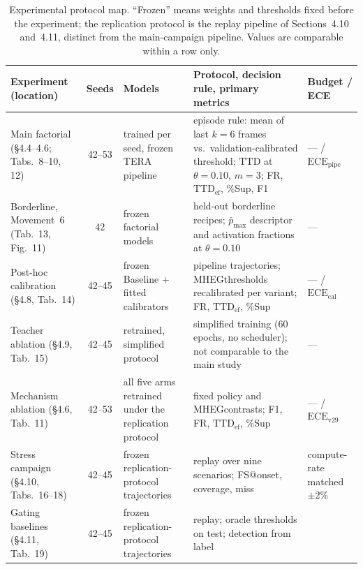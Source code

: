 \documentclass[1p,12pt,authoryear]{elsarticle}
\providecommand{\revcolor}{blue}
\providecommand{\MHEG}{MHEG}
\begin{document}
\begin{table}[!tbp]
\color{\revcolor}
\centering
\caption{Experimental protocol map. ``Frozen'' means weights and thresholds
fixed before the experiment; the replication protocol is the replay pipeline
of Sections~4.10 and~4.11,
distinct from the main-campaign pipeline. Values are comparable within a row
only.}

\scriptsize
\setlength{\tabcolsep}{2.8pt}
\renewcommand{\arraystretch}{1.18}
\begin{tabularx}{\textwidth}{>{\raggedright\arraybackslash}p{2.7cm}
  c >{\raggedright\arraybackslash}p{3.0cm} >{\raggedright\arraybackslash}X
  >{\raggedright\arraybackslash}p{2.4cm}}
\toprule
\textbf{Experiment (location)} & \textbf{Seeds} & \textbf{Models}
  & \textbf{Protocol, decision rule, primary metrics}
  & \textbf{Budget / ECE} \\
\midrule
Main factorial (\S4.4--4.6;
Tabs.~8--10,
12) & 42--53 & trained per seed, frozen TERA pipeline
  & episode rule: mean of last $k{=}6$ frames vs.\ validation-calibrated
    threshold; $\mathrm{TTD}$ at $\theta{=}0.10$, $m{=}3$; FR,
    $\mathrm{TTD}_{\mathrm{ef}}$, \%Sup, F1
  & --- / $\mathrm{ECE}_{\mathrm{pipe}}$ \\
Borderline, Movement~6 (Tab.~13,
Fig.~11) & 42 & frozen factorial models
  & held-out borderline recipes; $\bar{p}_{\max}$ descriptor and activation
    fractions at $\theta{=}0.10$ & --- \\
Post-hoc calibration (\S4.8,
Tab.~14) & 42--45 & frozen Baseline + fitted
  calibrators & pipeline trajectories; \MHEG thresholds recalibrated per
  variant; FR, $\mathrm{TTD}_{\mathrm{ef}}$, \%Sup
  & --- / $\mathrm{ECE}_{\mathrm{cal}}$ \\
Teacher ablation (\S4.9,
Tab.~15) & 42--45 & retrained, simplified protocol
  & simplified training (60 epochs, no scheduler); not comparable to the main
    study & --- \\
Mechanism ablation (\S4.6,
Tab.~11) & 42--53 & all five arms retrained under the
  replication protocol & fixed policy and \MHEG contrasts; F1, FR,
  $\mathrm{TTD}_{\mathrm{ef}}$, \%Sup & --- / $\mathrm{ECE}_{\mathrm{v29}}$ \\
Stress campaign (\S4.10,
Tabs.~16--18) & 42--45 & frozen replication-protocol trajectories
  & replay over nine scenarios; FS@onset, coverage, miss
  & compute-rate matched $\pm2\%$ \\
Gating baselines (\S4.11,
Tab.~19) & 42--45 & frozen replication-protocol
  trajectories & replay; oracle thresholds on test; detection from label

\end{tabularx}
\end{table}
\end{document}
